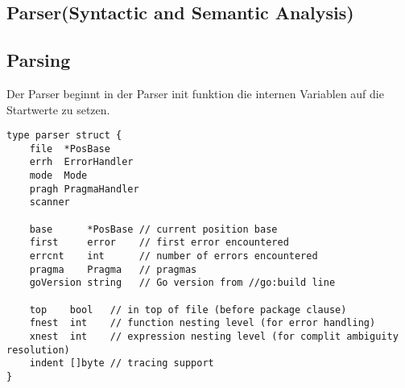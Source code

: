 \subsection{Parser(Syntactic and Semantic Analysis)}
\subsection{Parsing}
Der Parser beginnt in der Parser init funktion die internen Variablen auf die Startwerte zu setzen.
\begin{lstlisting}
type parser struct {
	file  *PosBase
	errh  ErrorHandler
	mode  Mode
	pragh PragmaHandler
	scanner

	base      *PosBase // current position base
	first     error    // first error encountered
	errcnt    int      // number of errors encountered
	pragma    Pragma   // pragmas
	goVersion string   // Go version from //go:build line

	top    bool   // in top of file (before package clause)
	fnest  int    // function nesting level (for error handling)
	xnest  int    // expression nesting level (for complit ambiguity resolution)
	indent []byte // tracing support
}
\end{lstlisting}

